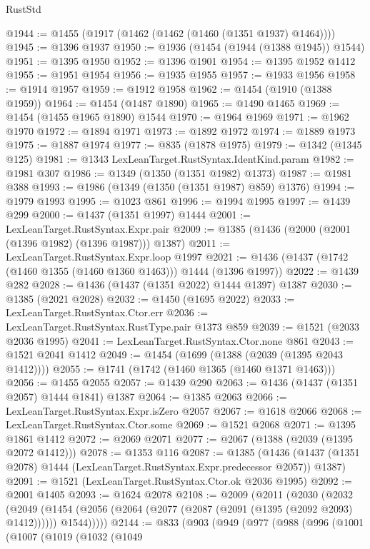 \begin{lexlean}{RustStd}
\begin{coremodule}
@1944 := @1455 (@1917 (@1462 (@1462 (@1460 (@1351 @1937) @1464))))
@1945 := @1396 @1937
@1950 := @1936 (@1454 (@1944 (@1388 @1945)) @1544)
@1951 := @1395 @1950
@1952 := @1396 @1901
@1954 := @1395 @1952 @1412
@1955 := @1951 @1954
@1956 := @1935 @1955
@1957 := @1933 @1956
@1958 := @1914 @1957
@1959 := @1912 @1958
@1962 := @1454 (@1910 (@1388 @1959))
@1964 := @1454 (@1487 @1890)
@1965 := @1490 @1465
@1969 := @1454 (@1455 @1965 @1890) @1544
@1970 := @1964 @1969
@1971 := @1962 @1970
@1972 := @1894 @1971
@1973 := @1892 @1972
@1974 := @1889 @1973
@1975 := @1887 @1974
@1977 := @835 (@1878 @1975)
@1979 := @1342 (@1345 @125)
@1981 := @1343 LexLeanTarget.RustSyntax.IdentKind.param
@1982 := @1981 @307
@1986 := @1349 (@1350 (@1351 @1982) @1373)
@1987 := @1981 @388
@1993 := @1986 (@1349 (@1350 (@1351 @1987) @859) @1376)
@1994 := @1979 @1993
@1995 := @1023 @861
@1996 := @1994 @1995
@1997 := @1439 @299
@2000 := @1437 (@1351 @1997) @1444
@2001 := LexLeanTarget.RustSyntax.Expr.pair
@2009 := @1385 (@1436 (@2000 (@2001 (@1396 @1982) (@1396 @1987))) @1387)
@2011 := LexLeanTarget.RustSyntax.Expr.loop @1997
@2021 := @1436 (@1437 (@1742 (@1460 @1355 (@1460 @1360 @1463))) @1444 (@1396 @1997))
@2022 := @1439 @282
@2028 := @1436 (@1437 (@1351 @2022) @1444 @1397) @1387
@2030 := @1385 (@2021 @2028)
@2032 := @1450 (@1695 @2022)
@2033 := LexLeanTarget.RustSyntax.Ctor.err
@2036 := LexLeanTarget.RustSyntax.RustType.pair @1373 @859
@2039 := @1521 (@2033 @2036 @1995)
@2041 := LexLeanTarget.RustSyntax.Ctor.none @861
@2043 := @1521 @2041 @1412
@2049 := @1454 (@1699 (@1388 (@2039 (@1395 @2043 @1412))))
@2055 := @1741 (@1742 (@1460 @1365 (@1460 @1371 @1463)))
@2056 := @1455 @2055
@2057 := @1439 @290
@2063 := @1436 (@1437 (@1351 @2057) @1444 @1841) @1387
@2064 := @1385 @2063
@2066 := LexLeanTarget.RustSyntax.Expr.isZero @2057
@2067 := @1618 @2066
@2068 := LexLeanTarget.RustSyntax.Ctor.some
@2069 := @1521 @2068
@2071 := @1395 @1861 @1412
@2072 := @2069 @2071
@2077 := @2067 (@1388 (@2039 (@1395 @2072 @1412)))
@2078 := @1353 @116
@2087 := @1385
    (@1436 (@1437 (@1351 @2078) @1444 (LexLeanTarget.RustSyntax.Expr.predecessor @2057)) @1387)
@2091 := @1521 (LexLeanTarget.RustSyntax.Ctor.ok @2036 @1995)
@2092 := @2001 @1405
@2093 := @1624 @2078
@2108 := @2009
    (@2011
      (@2030
        (@2032
          (@2049
            (@1454 (@2056 (@2064 (@2077 (@2087 (@2091 (@1395 (@2092 @2093) @1412)))))) @1544)))))
@2144 := @833
    (@903
      (@949
        (@977
          (@988
            (@996
              (@1001
                (@1007
                  (@1019
                    (@1032
                      (@1049

\end{coremodule}
\end{lexlean}
